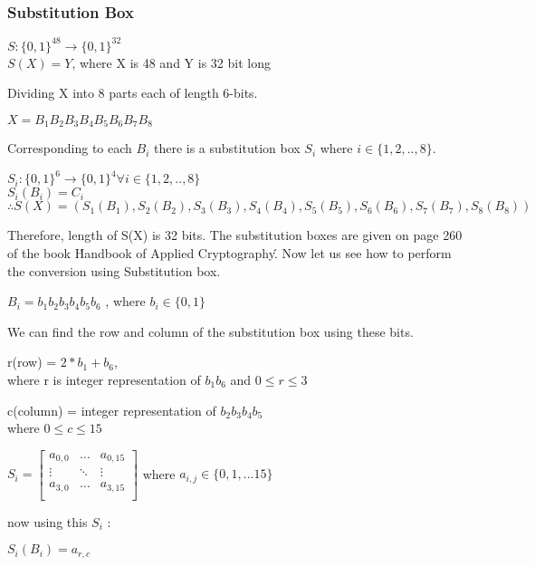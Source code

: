 \documentclass[11pt]{article}
\begin{document}
\subsubsection{Substitution Box}
\begin{center}
    $S: \{0, 1\}^{48} \rightarrow \{0, 1\}^{32}$\\
    $S(X) = Y$,  where X is 48 and Y is 32 bit long
\end{center}
Dividing X into 8 parts each of length 6-bits.
\begin{center}
    $X = B_1B_2B_3B_4B_5B_6B_7B_8$\\
\end{center}
Corresponding to each $B_i$ there is a substitution box $S_i$ where $i \in \{1,2,..,8\}$.
\begin{center}
    $S_i: \{0, 1\}^6 \rightarrow \{0, 1\}^4  \forall i \in \{1,2,..,8\}$\\
    $S_i(B_i) = C_i$\\
    $\therefore S(X) = (S_1(B_1), S_2(B_2), S_3(B_3), S_4(B_4), S_5(B_5), S_6(B_6), S_7(B_7), S_8(B_8))$ 
\end{center}
Therefore, length of S(X) is 32 bits.
\vspace{3mm}
The substitution boxes are given on page 260 of the book \'Handbook of Applied Cryptography\'. Now let us see how to perform the conversion using Substitution box.\\
\begin{center}
    $B_i = b_1b_2b_3b_4b_5b_6$ , where $b_i \in \{0,1\} $
\end{center}
We can find the row and column of the substitution box using these bits.\\
\begin{center}
    r(row) = $2*b_1 + b_6$, \\
    where r is integer representation of $b_1b_6$  and $0 \leq r \leq 3 $\\
\end{center}
\begin{center}
    c(column) = integer representation of $b_2b_3b_4b_5$\\
    where $0 \leq c \leq  15 $
\end{center}
\begin{center}
    $ S_i = 
    \begin{bmatrix}
        a_{0,0} & \dots & a_{0,15}\\
        \vdots & \ddots & \vdots\\
        a_{3,0} & \dots & a_{3,15}\\
    \end{bmatrix}$ 
    where $a_{i,j} \in \{0, 1,...15\}$
\end{center}
now using this $S_i$ :
\begin{center}
    $S_i(B_i) = a_{r,c}$
\end{center}
\end{document}
